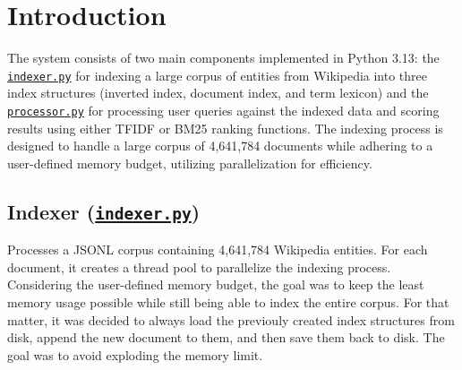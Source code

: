 

\section{Introduction}

The system consists of two main components implemented in Python 3.13: the \hyperref[subsec:indexer]{\texttt{indexer.py}} for indexing a large corpus of entities from Wikipedia into three index structures (inverted index, document index, and term lexicon) and the \hyperref[subsec:processor]{\texttt{processor.py}} for processing user queries against the indexed data and scoring results using either TFIDF or BM25 ranking functions. The indexing process is designed to handle a large corpus of 4,641,784 documents while adhering to a user-defined memory budget, utilizing parallelization for efficiency.

\subsection{Indexer (\hyperref[subsec:indexing]{\texttt{indexer.py}})} \label{subsec:indexer}

Processes a JSONL corpus containing 4,641,784 Wikipedia entities. For each document, it creates a thread pool to parallelize the indexing process. Considering the user-defined memory budget, the goal was to keep the least memory usage possible while still being able to index the entire corpus. For that matter, it was decided to always load the previouly created index structures from disk, append the new document to them, and then save them back to disk. The goal was to avoid exploding the memory limit.

